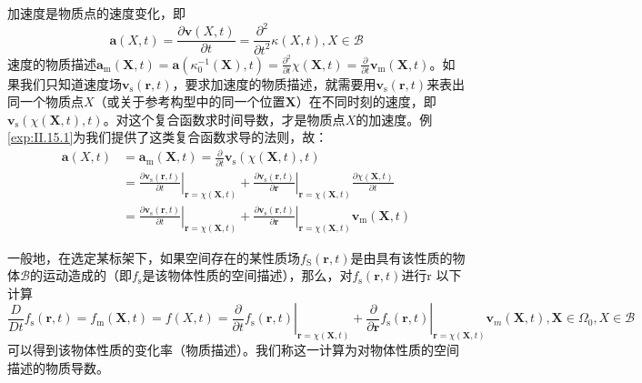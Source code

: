 \documentclass[main.tex]{subfiles}
\begin{document}
加速度是物质点的速度变化，即
\[\mathbf{a}\left(X,t\right)=\frac{\partial\mathbf{v}\left(X,t\right)}{\partial t}=\frac{\partial^2}{\partial t^2}\kappa\left(X,t\right),X\in\mathcal{B}\]
速度的物质描述$\mathbf{a}_\mathrm{m}\left(\mathbf{X},t\right)=\mathbf{a}\left(\kappa_0^{-1}\left(\mathbf{X}\right),t\right)=\frac{\partial^2}{\partial t}\chi\left(\mathbf{X},t\right)=\frac{\partial}{\partial t}\mathbf{v}_\mathrm{m}\left(\mathbf{X},t\right)$。如果我们只知道速度场$\mathbf{v}_\mathrm{s}\left(\mathbf{r},t\right)$，要求加速度的物质描述，就需要用$\mathbf{v}_\mathrm{s}\left(\mathbf{r},t\right)$来表出同一个物质点$X$（或关于参考构型中的同一个位置$\mathbf{X}$）在不同时刻的速度，即$\mathbf{v}_\mathrm{s}\left(\chi\left(\mathbf{X},t\right),t\right)$。对这个复合函数求时间导数，才是物质点$X$的加速度。例\ref{exp:II.15.1}为我们提供了这类复合函数求导的法则，故：
\begin{align*}
\mathbf{a}\left(X,t\right)&=\mathbf{a}_\mathrm{m}\left(\mathbf{X},t\right)=\frac{\partial}{\partial t}\mathbf{v}_\mathrm{s}\left(\chi\left(\mathbf{X},t\right),t\right)\\
&=\left.\frac{\partial \mathbf{v}_\mathrm{s}\left(\mathbf{r},t\right)}{\partial t}\right|_{\mathbf{r}=\chi\left(\mathbf{X},t\right)}+\left.\frac{\partial\mathbf{v}_\mathrm{s}\left(\mathbf{r},t\right)}{\partial\mathbf{r}}\right|_{\mathbf{r}=\chi\left(\mathbf{X},t\right)}\frac{\partial\chi\left(\mathbf{X},t\right)}{\partial t}\\
&=\left.\frac{\partial \mathbf{v}_\mathrm{s}\left(\mathbf{r},t\right)}{\partial t}\right|_{\mathbf{r}=\chi\left(\mathbf{X},t\right)}+\left.\frac{\partial\mathbf{v}_\mathrm{s}\left(\mathbf{r},t\right)}{\partial\mathbf{r}}\right|_{\mathbf{r}=\chi\left(\mathbf{X},t\right)}\mathbf{v}_\mathrm{m}\left(\mathbf{X},t\right)
\end{align*}

一般地，在选定某标架下，如果空间存在的某性质场$f_\mathrm{S}\left(\mathbf{r},t\right)$是由具有该性质的物体$\mathcal{B}$的运动造成的（即$f_\mathrm{s}$是该物体性质的空间描述），那么，对$f_\mathrm{s}\left(\mathbf{r},t\right)$进行r 以下计算
\[
\frac{D}{Dt}f_\mathrm{s}\left(\mathbf{r},t\right)=f_\mathrm{m}\left(\mathbf{X},t\right)=f\left(X,t\right)=\left.\frac{\partial}{\partial t}f_\mathrm{s}\left(\mathbf{r},t\right)\right|_{\mathbf{r}=\chi\left(\mathbf{X},t\right)}+\left.\frac{\partial}{\partial \mathbf{r}}f_\mathrm{s}\left(\mathbf{r},t\right)\right|_{\mathbf{r}=\chi\left(\mathbf{X},t\right)}\mathbf{v}_m\left(\mathbf{X},t\right),\mathbf{X}\in\Omega_0,X\in\mathcal{B}\]
可以得到该物体性质的变化率（物质描述）。我们称这一计算为对物体性质的空间描述的物质导数。
\end{document}
